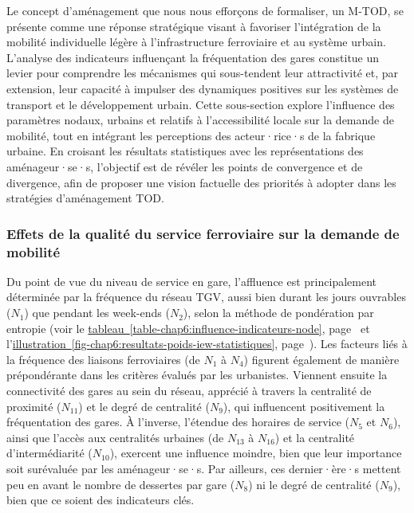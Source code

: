 \begin{refsegment}
Le concept d’aménagement que nous nous efforçons de formaliser, un \acrfull{M-TOD}, se présente comme une réponse stratégique visant à favoriser l’intégration de la mobilité individuelle légère à l'infrastructure ferroviaire et au système urbain. L’analyse des indicateurs influençant la fréquentation des gares constitue un levier pour comprendre les mécanismes qui sous-tendent leur attractivité et, par extension, leur capacité à impulser des dynamiques positives sur les systèmes de transport et le développement urbain. Cette sous-section explore l’influence des paramètres nodaux, urbains et relatifs à l’accessibilité locale sur la demande de mobilité, tout en intégrant les perceptions des acteur·rice·s de la fabrique urbaine. En croisant les résultats statistiques avec les représentations des aménageur·se·s, l’objectif est de révéler les points de convergence et de divergence, afin de proposer une vision factuelle des priorités à adopter dans les stratégies d’aménagement \acrshort{TOD}.%

\subsubsection*{Effets de la qualité du service ferroviaire sur la demande de mobilité
    \label{chap6:results-influence-indicateurs-node}
    }

Du point de vue du niveau de service en gare, l'affluence est principalement déterminée par la fréquence du réseau \acrshort{TGV}, aussi bien durant les jours ouvrables (\(N_{1}\)) que pendant les week-ends (\(N_{2}\)), selon la méthode de pondération par entropie (voir le \hyperref[table-chap6:influence-indicateurs-node]{tableau~\ref{table-chap6:influence-indicateurs-node}}, page~\pageref{table-chap6:influence-indicateurs-node} et l'\hyperref[fig-chap6:resultats-poids-iew-statistiques]{illustration~\ref{fig-chap6:resultats-poids-iew-statistiques}}, page~\pageref{fig-chap6:resultats-poids-iew-statistiques}). Les facteurs liés à la fréquence des liaisons ferroviaires (de \(N_{1}\) à \(N_{4}\)) figurent également de manière prépondérante dans les critères évalués par les urbanistes. Viennent ensuite la connectivité des gares au sein du réseau, apprécié à travers la centralité de proximité (\(N_{11}\)) et le degré de centralité (\(N_{9}\)), qui influencent positivement la fréquentation des gares. À l'inverse, l'étendue des horaires de service (\(N_{5}\) et \(N_{6}\)), ainsi que l'accès aux centralités urbaines (de \(N_{13}\) à \(N_{16}\)) et la centralité d'intermédiarité (\(N_{10}\)), exercent une influence moindre, bien que leur importance soit surévaluée par les aménageur·se·s. Par ailleurs, ces dernier·ère·s mettent peu en avant le nombre de dessertes par gare (\(N_{8}\)) ni le degré de centralité (\(N_{9}\)), bien que ce soient des indicateurs clés.%


\end{refsegment}
